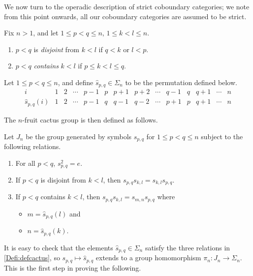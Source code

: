 We now turn to the operadic description of strict coboundary categories; we note from this point onwards, all our coboundary categories are assumed to be strict.

\begin{Defi}
Fix $n>1$, and let $1 \leq p < q \leq n$, $1 \leq k < l \leq n$.
\begin{enumerate}
\item $p<q$ is \textit{disjoint} from $k<l$ if $q<k$ or $l<p$.
\item $p<q$ \textit{contains} $k<l$ if $p \leq k < l \leq q$.
\end{enumerate}
\end{Defi}

\begin{Defi}
Let $1 \leq p < q \leq n$, and define $\hat{s}_{p,q} \in \Sigma_{n}$ to be the permutation defined below.
  \[
    \begin{array}{r|ccccccccccccc}
      i & 1 & 2 & \cdots & p-1 & p & p+1 & p+2 & \cdots & q-1 & q & q+1 & \cdots & n \\
      \hat{s}_{p,q}(i) & 1 & 2 & \cdots & p-1 & q & q-1 & q-2 & \cdots & p+1 & p & q+1 & \cdots & n
    \end{array}
  \]
\end{Defi}

The $n$-fruit cactus group is then defined as follows.

\begin{Defi}\label{Defi:defcactus}
Let $J_{n}$ be the group generated by symbols $s_{p,q}$ for $1 \leq p < q \leq n$ subject to the following relations.
  \begin{enumerate}
    \item For all $p < q$, $s_{p,q}^{2}=e$.
    \item If $p<q$ is disjoint from $k<l$, then $s_{p,q}s_{k,l} = s_{k,l}s_{p,q}$.
    \item If $p<q$ contains $k<l$, then $s_{p,q}s_{k,l} = s_{m,n}s_{p,q}$ where
      \begin{itemize}
        \item $m = \hat{s}_{p,q}(l)$ and
        \item $n = \hat{s}_{p,q}(k)$.
      \end{itemize}
  \end{enumerate}
\end{Defi}

It is easy to check that the elements $\hat{s}_{p,q} \in \Sigma_{n}$ satisfy the three relations in \cref{Defi:defcactus}, so $s_{p,q} \mapsto \hat{s}_{p,q}$ extends to a group homomorphism $\pi_{n} \colon J_{n} \rightarrow \Sigma_{n}$. This is the first step in proving the following.

